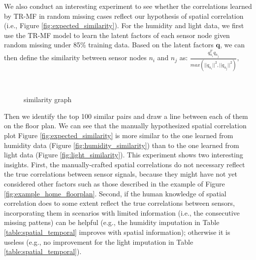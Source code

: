 We also conduct an interesting experiment to see whether the correlations learned by TR-MF in random missing cases reflect our hypothesis of spatial correlation (i.e., Figure \ref{fig:expected_similarity}).
For the humidity and light data, we first use the TR-MF model to learn the latent factors of each sensor node given random missing under 85\% training data.
Based on the latent factors $\mathbf{q}$, we can then define the similarity between sensor nodes $n_i$ and $n_j$ as:
$\frac{q_{n_i}^T q_{n_j}}{max(||q_{n_i}||^2, ||q_{n_j}||^2)},$
\begin{figure}[ftbp]
\centering
{}\\
\hspace{0in}
\caption{similarity graph}
\label{fig:similarity}
\end{figure}

Then we identify the top 100 similar pairs and draw a line between each of them on the floor plan.
We can see that the manually hypothesized spatial correlation plot Figure \ref{fig:expected_similarity} is more similar to the one learned from humidity data (Figure \ref{fig:humidity_similarity}) than to the one learned from light data (Figure \ref{fig:light_similarity}).
This experiment shows two interesting insights.
First, the manually-crafted spatial correlations do not necessary reflect the true correlations between sensor signals, because they might have not yet considered other factors such as those described in the example of Figure \ref{fig:example_home_floorplan}.
Second, if the human knowledge of spatial correlation does to some extent reflect the true correlations between sensors, incorporating them in scenarios with limited information (i.e., the consecutive missing pattens) can be helpful (e.g., the humidity imputation in Table \ref{table:spatial_temporal} improves with spatial information); otherwise it is useless (e.g., no improvement for the light imputation in Table \ref{table:spatial_temporal}).
